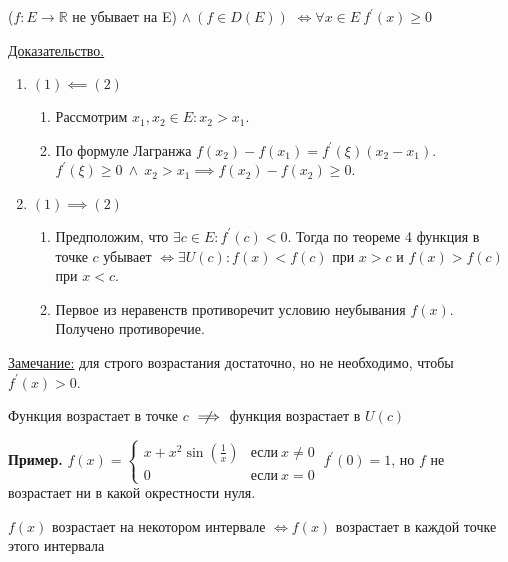 \documentclass{article}
\begin{document}
\begin{theorem}
    (\(f: E \to \mathbb{R}\) не убывает на E) \(\land\ (f \in D(E))\) \(\iff \forall x \in E\ f^{\prime}(x) \geq 0\) 
\end{theorem}
\noindent \underline{Доказательство.}
\begin{enumerate}
    \item \((1) \impliedby (2)\)
    \begin{enumerate}
        \item Рассмотрим \(x_1, x_2 \in E: x_2 > x_1\).
        \item По формуле Лагранжа \(f(x_2) - f(x_1) = f^{\prime} (\xi)(x_2 - x_1)\). \(f^{\prime}(\xi) \geq 0\ \land\ x_2 > x_1 \implies f(x_2) - f(x_2) \geq 0\).  
    \end{enumerate}
    \item \((1) \implies (2)\)
    \begin{enumerate}
        \item Предположим, что \(\exists c \in E: f^{\prime}(c) < 0\). Тогда по теореме 4 функция в точке \(c\) убывает \(\iff \exists U(c): f(x) < f(c)\) при \(x > c\) и \(f(x) > f(c)\) при \(x < c\).
        \item Первое из неравенств противоречит условию неубывания \(f(x)\). Получено противоречие.  
    \end{enumerate} 
\end{enumerate}
\noindent \underline{Замечание:} для строго возрастания достаточно, но не необходимо, чтобы \(f^{\prime}(x) > 0\). 

\begin{claim}
    Функция возрастает в точке \(c\) \(\centernot\implies\) функция возрастает в \(U(c)\) 
\end{claim}
\noindent \textbf{Пример.} \(\displaystyle f(x) =
\begin{cases}
    \displaystyle x + x^2 \sin \left(\frac{1}{x}\right) & \text{если}\ x \neq 0\\
    0 & \text{если}\ x = 0  
\end{cases}\ f^{\prime}(0) = 1\), но \(f\) не возрастает ни в какой окрестности нуля.

\begin{claim}
    \(f(x)\) возрастает на некотором интервале \(\iff f(x)\) возрастает в каждой точке этого интервала
\end{claim}
\end{document}
